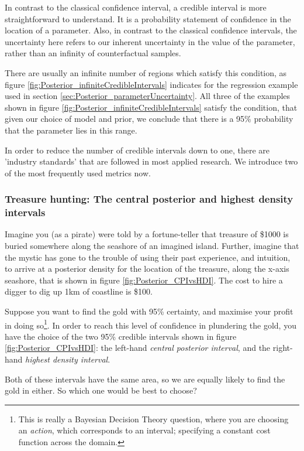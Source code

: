 \documentclass[11pt,fullpage]{book}
\begin{document}
In contrast to the classical confidence interval, a credible interval is more straightforward to understand. It is a probability statement of confidence in the location of a parameter. Also, in contrast to the classical confidence intervals, the uncertainty here refers to our inherent uncertainty in the value of the parameter, rather than an infinity of counterfactual samples.

There are usually an infinite number of regions which satisfy this condition, as figure \ref{fig:Posterior_infiniteCredibleIntervals} indicates for the regression example used in section \ref{sec:Posterior_parameterUncertainty}. All three of the examples shown in figure \ref{fig:Posterior_infiniteCredibleIntervals} satisfy the condition, that given our choice of model and prior, we conclude that there is a 95\% probability that the parameter lies in this range. 

In order to reduce the number of credible intervals down to one, there are 'industry standards' that are followed in most applied research. We introduce two of the most frequently used metrics now.

\subsubsection{Treasure hunting: The central posterior and highest density intervals}\label{sec:Posterior_CPI}\label{sec:Posterior_HDI}
Imagine you (as a pirate) were told by a fortune-teller that treasure of \$1000 is buried somewhere along the seashore of an imagined island. Further, imagine that the mystic has gone to the trouble of using their past experience, and intuition, to arrive at a posterior density for the location of the treasure, along the x-axis seashore, that is shown in figure \ref{fig:Posterior_CPIvsHDI}. The cost to hire a digger to dig up 1km of coastline is \$100.

Suppose you want to find the gold with 95\% certainty, and maximise your profit in doing so\footnote{This is really a Bayesian Decision Theory question, where you are choosing an \textit{action}, which corresponds to an interval; specifying a constant cost function across the domain.}. In order to reach this level of confidence in plundering the gold, you have the choice of the two 95\% credible intervals shown in figure \ref{fig:Posterior_CPIvsHDI}: the left-hand \textit{central posterior interval}, and the right-hand \textit{highest density interval}.

Both of these intervals have the same area, so we are equally likely to find the gold in either. So which one would be best to choose?
\end{document}
